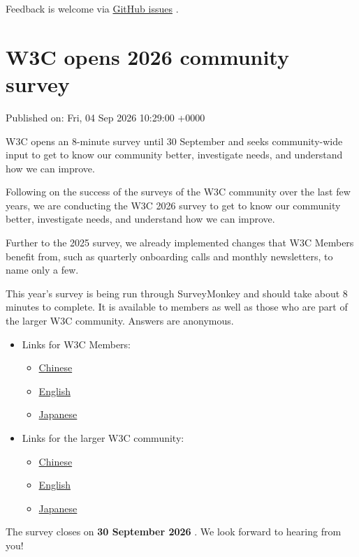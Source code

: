 \documentclass[11pt,a4paper]{article}
\begin{document}
Feedback is welcome via \href{https://github.com/w3c/webauthn/issues}{GitHub issues} .

\section{W3C opens 2026 community survey}

Published on: Fri, 04 Sep 2026 10:29:00 +0000

W3C opens an 8-minute survey until 30 September and seeks community-wide input to get to know our community better, investigate needs, and understand how we can improve.

Following on the success of the surveys of the W3C community over the last few years, we are conducting the W3C 2026 survey to get to know our community better, investigate needs, and understand how we can improve.

Further to the 2025 survey, we already implemented changes that W3C Members benefit from, such as quarterly onboarding calls and monthly newsletters, to name only a few.

This year's survey is being run through SurveyMonkey and should take about 8 minutes to complete. It is available to members as well as those who are part of the larger W3C community. Answers are anonymous.

\begin{itemize}
\item Links for W3C Members:
  \begin{itemize}
\item \href{https://www.surveymonkey.com/r/FFXQNHL}{Chinese}
\item \href{https://www.surveymonkey.com/r/8F55Y7K}{English}
\item \href{https://www.surveymonkey.com/r/7KFXNFB}{Japanese}
  \end{itemize}
\item Links for the larger W3C community:
  \begin{itemize}
\item \href{https://www.surveymonkey.com/r/83CQVX9}{Chinese}
\item \href{https://www.surveymonkey.com/r/FFGP6DL}{English}
\item \href{https://www.surveymonkey.com/r/FF9V2DH}{Japanese}
  \end{itemize}
\end{itemize}

The survey closes on \textbf{30 September 2026} . We look forward to hearing from you!
\end{document}
